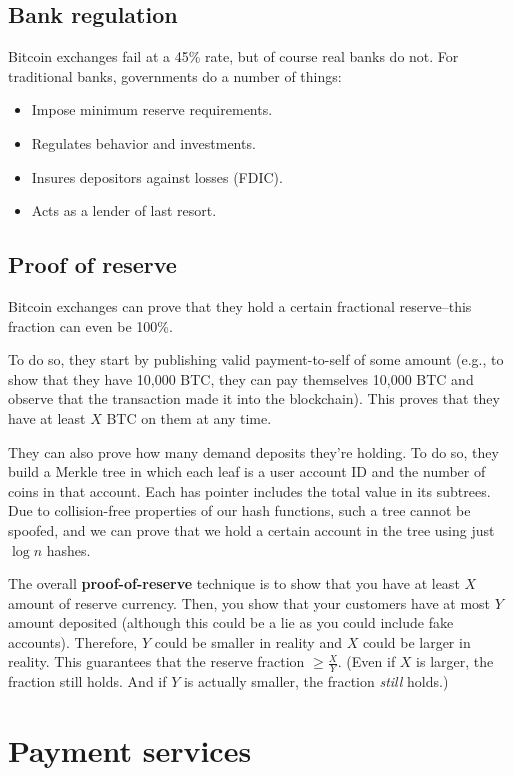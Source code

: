 \documentclass[12pt]{article}
\begin{document}
\subsection*{Bank regulation}

Bitcoin exchanges fail at a 45\% rate, but of course real banks do not. For traditional banks, governments do a number of things:
\begin{itemize}
\item Impose minimum reserve requirements.
\item Regulates behavior and investments.
\item Insures depositors against losses (FDIC).
\item Acts as a lender of last resort.
\end{itemize}

\subsection*{Proof of reserve}

Bitcoin exchanges can prove that they hold a certain fractional reserve--this fraction can even be 100\%.

To do so, they start by publishing valid payment-to-self of some amount (e.g., to show that they have 10,000 BTC, they can pay themselves 10,000 BTC and observe that the transaction made it into the blockchain). This proves that they have at least $X$ BTC on them at any time.

They can also prove how many demand deposits they're holding. To do so, they build a Merkle tree in which each leaf is a user account ID and the number of coins in that account. Each has pointer includes the total value in its subtrees. Due to collision-free properties of our hash functions, such a tree cannot be spoofed, and we can prove that we hold a certain account in the tree using just $\log{n}$ hashes.

The overall \textbf{proof-of-reserve} technique is to show that you have at least $X$ amount of reserve currency. Then, you show that your customers have at most $Y$ amount deposited (although this could be a lie as you could include fake accounts). Therefore, $Y$ could be smaller in reality and $X$ could be larger in reality. This guarantees that the reserve fraction $\geq \frac{X}{Y}$. (Even if $X$ is larger, the fraction still holds. And if $Y$ is actually smaller, the fraction \textit{still} holds.)

\section*{Payment services}
\end{document}

